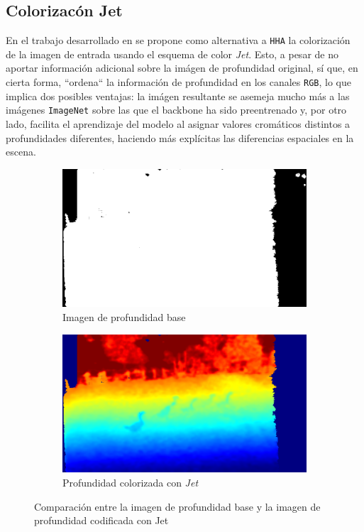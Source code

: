 \documentclass[12pt,a4paper]{report}
\begin{document}
\subsection{Colorizacón Jet}
\label{subsec:jet_colorization}
En el trabajo desarrollado en \cite{eitel2015multimodaldeeplearningrobust} se propone como alternativa a \texttt{HHA} la colorización de la imagen de entrada usando el esquema de color \textit{Jet}. Esto, a pesar de no aportar información adicional sobre la imágen de profundidad original, sí que, en cierta forma, ``ordena`` la información de profundidad en los canales \texttt{RGB}, lo que implica dos posibles ventajas: la imágen resultante se asemeja mucho más a las imágenes \texttt{ImageNet} sobre las que el backbone ha sido preentrenado y, por otro lado, facilita el aprendizaje del modelo al asignar valores cromáticos distintos a profundidades diferentes, haciendo más explícitas las diferencias espaciales en la escena.

\begin{figure}[!h]
    \centering
    \begin{subfigure}{0.45\textwidth}
        \centering
        \includegraphics[width=\textwidth]{media/data/depth_gueese.png}
        \caption{Imagen de profundidad base}
        \label{fig:depth-base-jet}
    \end{subfigure}
    \hfill
    \begin{subfigure}{0.45\textwidth}
        \centering
        \includegraphics[width=\textwidth]{media/data/jet_gueese.png}
        \caption{Profundidad colorizada con \textit{Jet}}
        \label{fig:jet-colorization}
    \end{subfigure}
    \caption{Comparación entre la imagen de profundidad base y la imagen de profundidad codificada con Jet}
    \label{fig:jet-comparison}
\end{figure}
\end{document}
